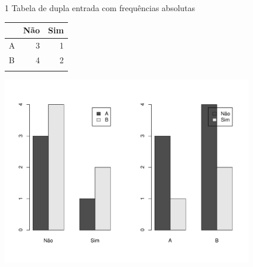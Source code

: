 \documentclass[
  ignorenonframetext,
  serif,
  professionalfont,
  usenames,
  dvipsnames,
  aspectratio = 169]{beamer}
\def\beginAThirdColumn{\begin{minipage}{0.31\textwidth}}%
\def\beginTwoThirdsColumn{\begin{minipage}{0.64\textwidth}}%
\def\endColumns{\end{minipage}}%
\begin{document}
\begin{frame}{1 Tabela de dupla entrada com frequências absolutas}
\label{tabela-de-dupla-entrada-com-frequuxeancias-absolutas}
\beginAThirdColumn

\begin{longtable}[]{@{}lrr@{}}
\toprule\noalign{}
& Não & Sim \\
\midrule\noalign{}
\endhead
A & 3 & 1 \\
B & 4 & 2 \\
\bottomrule\noalign{}
\end{longtable}

\endColumns
\beginTwoThirdsColumn

\begin{center}\includegraphics[width=11cm]{exercicios-encontro2-solucao_files/figure-beamer/unnamed-chunk-16-1} \end{center}

\endColumns
\end{frame}
\end{document}

